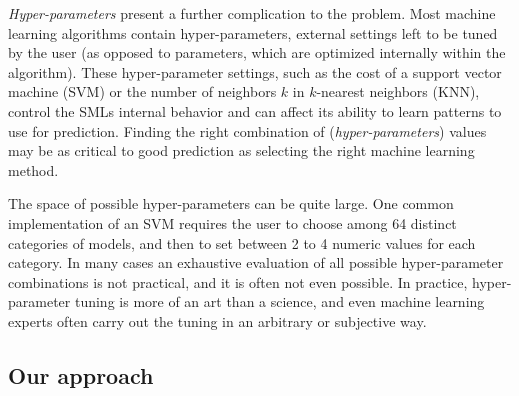 \emph{Hyper-parameters} present a further complication to the problem. Most machine learning
algorithms contain hyper-parameters, external settings left to be tuned by the user (as opposed to
parameters, which are optimized internally within the algorithm). These hyper-parameter settings,
such as the cost of a support vector machine (SVM) or the number of neighbors $k$ in $k$-nearest
neighbors (KNN), control the SMLs internal behavior and can affect its ability to  learn patterns to
use for prediction. Finding the right combination of (\emph{hyper-parameters}) values may be as
critical to good prediction as selecting the right machine learning method.

The space of possible hyper-parameters can be quite large. One common implementation of an SVM
requires the user to choose among 64 distinct categories of models, and then to set between 2 to 4
numeric values for each category. In many cases an exhaustive evaluation of all possible
hyper-parameter combinations is not practical, and it is often not even possible. In practice,
hyper-parameter tuning is more of an art than a science, and even machine learning experts often
carry out the tuning in an arbitrary or subjective way.


\subsection{Our approach}



